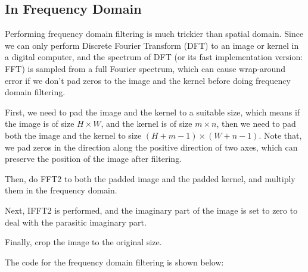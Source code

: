 \documentclass[
]{article}
\begin{document}
\hypertarget{in-frequency-domain}{%
\subsection{In Frequency Domain}\label{in-frequency-domain}}

Performing frequency domain filtering is much trickier than spatial
domain. Since we can only perform Discrete Fourier Transform (DFT) to an
image or kernel in a digital computer, and the spectrum of DFT (or its
fast implementation version: FFT) is sampled from a full Fourier
spectrum, which can cause wrap-around error if we don't pad zeros to the
image and the kernel before doing frequency domain filtering.

First, we need to pad the image and the kernel to a suitable size, which
means if the image is of size \(H\times W\), and the kernel is of size
\(m\times n\), then we need to pad both the image and the kernel to size
\((H+m-1)\times (W+n-1)\). Note that, we pad zeros in the direction
along the positive direction of two axes, which can preserve the
position of the image after filtering.

Then, do FFT2 to both the padded image and the padded kernel, and
multiply them in the frequency domain.

Next, IFFT2 is performed, and the imaginary part of the image is set to
zero to deal with the parasitic imaginary part.

Finally, crop the image to the original size.

The code for the frequency domain filtering is shown below:
\end{document}
